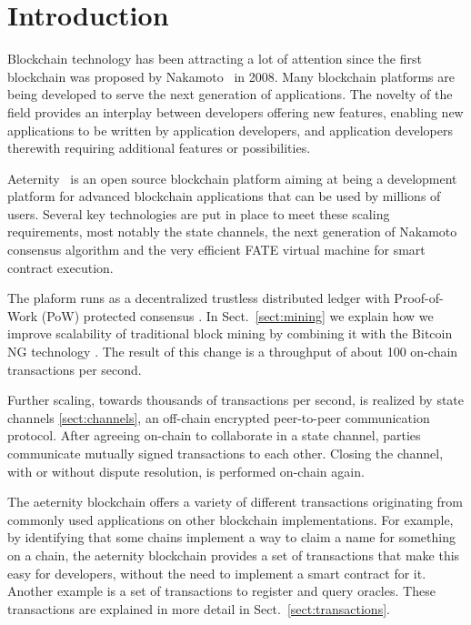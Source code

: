 \section{Introduction}

Blockchain technology has been attracting a lot of attention since the
first blockchain was proposed by Nakamoto~\cite{SN} in 2008.
Many blockchain platforms are being developed to serve the next
generation of applications. The novelty of the field provides an
interplay between developers offering new features, enabling new
applications to be written by application developers, and application
developers therewith requiring additional features or possibilities.

Aeternity~\cite{AE,UlfWigerCodeMesh2018} is an open source blockchain
platform aiming at being a development platform for
advanced blockchain applications that can be used by millions of
users. Several key technologies are put in place to meet these scaling
requirements, most notably the state channels, the next generation of
Nakamoto consensus algorithm and the very efficient FATE virtual
machine for smart contract execution.

The plaform runs as a decentralized trustless distributed
ledger with Proof-of-Work (PoW) protected consensus \cite{Tromp2015CuckooCA}.
In Sect.~\ref{sect:mining} we explain how we improve scalability of traditional
block mining by combining it with the Bitcoin NG technology
\cite{Eyal:2016:BSB:2930611.2930615}. The result of this change
is a throughput of about 100 on-chain transactions per second.

Further scaling, towards thousands of transactions per second, is
realized by state channels \ref{sect:channels}, an off-chain encrypted
peer-to-peer communication protocol. After agreeing on-chain to
collaborate in a state channel, parties communicate mutually signed
transactions to each other. Closing the channel, with or without
dispute resolution, is performed on-chain again.

The aeternity blockchain offers a variety of different transactions originating from commonly
used applications on other blockchain implementations. For example, by
identifying that some chains implement a way to claim a name for
something on a chain, the aeternity blockchain provides a set of
transactions that make this easy for developers, without the need to
implement a smart contract for it. Another example is a set of transactions to register and
query oracles. These transactions are explained in more detail in
Sect.\ \ref{sect:transactions}.

